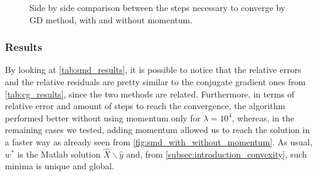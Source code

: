 \begin{figure}[H]
    \centering
    \caption{Side by side comparison between the steps necessary to converge by GD method, with and without momentum.}
    \label{fig:smd_with_without_momentum}
\end{figure}

\subsubsection{Results}
By looking at \autoref{tab:smd_results}, it is possible to notice that the relative errors and the relative residuals are pretty similar to the conjugate gradient ones from \autoref{tab:cg_results}, since the two methods are related. Furthermore, in terms of relative error and amount of steps to reach the convergence, the algorithm performed better without using momentum only for $\lambda = 10^4$, whereas, in the remaining cases we tested, adding momentum allowed us to reach the solution in a faster way as already seen from \autoref{fig:smd_with_without_momentum}. As usual, $w^*$ is the Matlab solution $\hat{X}\backslash \hat{y}$ and, from \ref{subsec:introduction_convexity}, such minima is unique and global.

